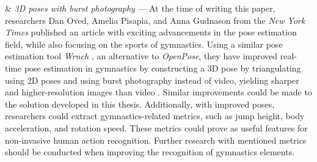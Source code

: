 \begin{easylist}[enumerate]
& \textit{3D poses with burst photography} --- At the time of writing this paper, researchers Dan Oved, Amelia Pisapia, and Anna Gudnason from the \textit{New York Times} published an article with exciting advancements in the pose estimation field, while also focusing on the sports of gymnastics. Using a similar pose estimation tool \textit{Wrnch} \cite{wrnchai}, an alternative to \textit{OpenPose}, they have improved real-time pose estimation in gymnastics by constructing a 3D pose by triangulating using 2D poses and using burst photography instead of video, yielding sharper and higher-resolution images than video \cite{nyt-pose-estimation}. Similar improvements could be made to the solution developed in this thesis. Additionally, with improved poses, researchers could extract gymnastics-related metrics, such as jump height, body acceleration, and rotation speed. These metrics could prove as useful features for non-invasive human action recognition. Further research with mentioned metrics should be conducted when improving the recognition of gymnastics elements.
    
\end{easylist}






















